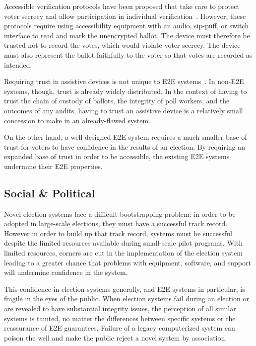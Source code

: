 Accessible verification protocols have been proposed that take care to
protect voter secrecy and allow participation in individual
verification~\cite{chaum2009accessible}. However, these protocols
require using accessibility equipment with an audio, sip-puff, or
switch interface to read and mark the unencrypted ballot. The device
must therefore be trusted not to record the votes, which would violate
voter secrecy. The device must also represent the ballot faithfully to
the voter so that votes are recorded as intended.

Requiring trust in assistive devices is not unique to E2E
systems~\cite{runyan2007improving}. In non-E2E systems, though, trust
is already widely distributed. In the context of having to trust the
chain of custody of ballots, the integrity of poll workers, and the
outcomes of any audits, having to trust an assistive device is a
relatively small concession to make in an already-flawed system.

On the other hand, a well-designed E2E system requires a much smaller
base of trust for voters to have confidence in the results of an
election. By requiring an expanded base of trust in order to be
accessible, the existing E2E systems undermine their E2E properties.

\subsection{Social \& Political}

Novel election systems face a difficult bootstrapping problem: in
order to be adopted in large-scale elections, they must have a
successful track record. However in order to build up that track
record, systems must be successful despite the limited resources
available during small-scale pilot programs. With limited resources,
corners are cut in the implementation of the election system leading
to a greater chance that problems with equipment, software, and
support will undermine confidence in the system.

This confidence in election systems generally, and E2E systems in
particular, is fragile in the eyes of the public. When election
systems fail during an election or are revealed to have substantial
integrity issues, the perception of all similar systems is tainted, no
matter the differences between specific systems or the reassurance of
E2E guarantees. Failure of a legacy computerized system can poison the
well and make the public reject a novel system by association.

